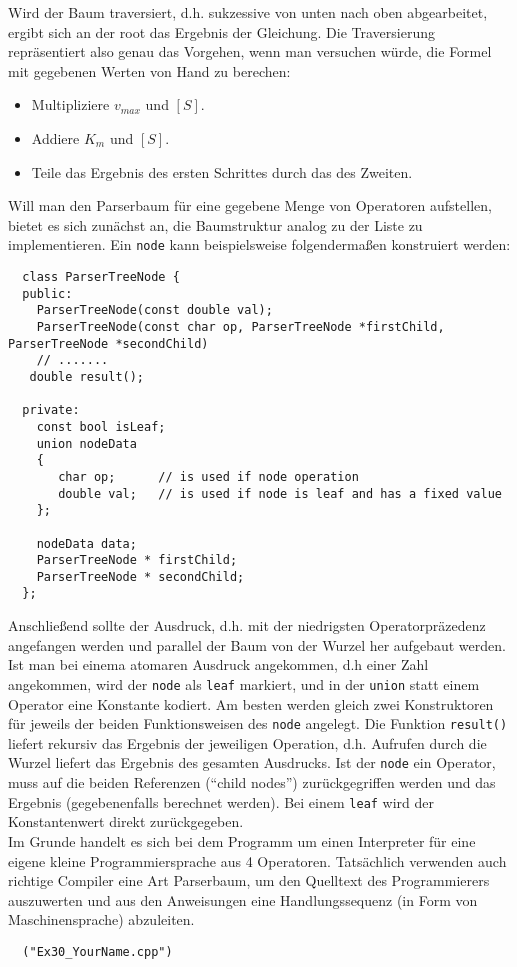 \documentclass[paper=A4, pagesize, DIV=calc, smallheadings,
fontsize=11pt, expansion=false]{scrreprt}
\begin{document}
Wird der Baum traversiert, d.h. sukzessive von unten nach oben abgearbeitet, ergibt sich an der root das Ergebnis der Gleichung.
Die Traversierung repräsentiert also genau das Vorgehen, wenn man versuchen würde, die Formel mit gegebenen Werten von Hand zu berechen: 
\begin{itemize}
\item Multipliziere $v_{max}$ und $[S]$.
\item Addiere $K_m$ und $[S]$.
\item Teile das Ergebnis des ersten Schrittes durch das des Zweiten.
\end{itemize}

Will man den Parserbaum für eine gegebene Menge von Operatoren aufstellen, bietet es sich zunächst an, die Baumstruktur analog zu der Liste zu implementieren. 
Ein \texttt{node} kann beispielsweise folgendermaßen konstruiert werden:

\begin{verbatim}
  class ParserTreeNode {
  public:
    ParserTreeNode(const double val);
    ParserTreeNode(const char op, ParserTreeNode *firstChild, ParserTreeNode *secondChild)
    // .......
   double result();

  private:
    const bool isLeaf;
    union nodeData
    {  
       char op;      // is used if node operation   
       double val;   // is used if node is leaf and has a fixed value
    };

    nodeData data;
    ParserTreeNode * firstChild;
    ParserTreeNode * secondChild;
  };
\end{verbatim}

Anschließend sollte der Ausdruck, d.h. mit der niedrigsten Operatorpräzedenz angefangen werden und parallel der Baum von der Wurzel her aufgebaut werden. Ist man bei einema atomaren Ausdruck angekommen, d.h einer Zahl angekommen, wird der \texttt{node} als \texttt{leaf} markiert, und in der \texttt{union} statt einem Operator eine Konstante kodiert. 
Am besten werden gleich zwei Konstruktoren für jeweils der beiden Funktionsweisen des \texttt{node} angelegt.
Die Funktion \texttt{result()} liefert rekursiv das Ergebnis der jeweiligen Operation, d.h. Aufrufen durch die Wurzel liefert das Ergebnis des gesamten Ausdrucks.
Ist der \texttt{node} ein Operator, muss auf die beiden Referenzen (``child nodes'') zurückgegriffen werden und das Ergebnis (gegebenenfalls berechnet werden).
Bei einem \texttt{leaf} wird der Konstantenwert direkt zurückgegeben.\\
Im Grunde handelt es sich bei dem Programm um einen Interpreter für eine eigene kleine Programmiersprache aus 4 Operatoren.
Tatsächlich verwenden auch richtige Compiler eine Art Parserbaum, um den Quelltext des Programmierers auszuwerten und aus den Anweisungen eine Handlungssequenz (in Form von Maschinensprache) abzuleiten.
\begin{verbatim}
  ("Ex30_YourName.cpp")
\end{verbatim}
\end{document}
